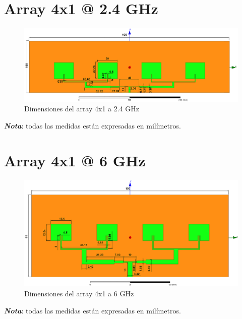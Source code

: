 \section{Array 4x1 @ 2.4 GHz}
\vfill
\begin{figure}[H]
   	 \centering
        \includegraphics[width=19cm ,height=\textheight, keepaspectratio=true, angle=90,origin=c]{archivos/desarrollo/autocad/5}
        \caption{Dimensiones del array 4x1 a 2.4 GHz}
        \label{fig:4x11}
\end{figure}
\vfill
\textit{\textbf{Nota}}: todas las medidas están expresadas en milímetros.
\newpage

\section{Array 4x1 @ 6 GHz}
\vfill
\begin{figure}[H]
   	 \centering
        \includegraphics[width=19cm ,height=\textwidth, keepaspectratio=true, angle=90,origin=c]{archivos/desarrollo/autocad/6}
        \caption{Dimensiones del array 4x1 a 6 GHz}
        \label{fig:4x12}
\end{figure}
\vfill
\textit{\textbf{Nota}}: todas las medidas están expresadas en milímetros.
\newpage

